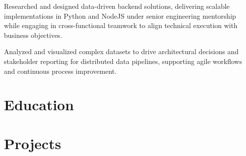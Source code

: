 \documentclass[10pt,a4paper]{resume}
\begin{document}
\bulletsend
\vspace{1.5pt}
\bullets
  \item Researched and designed data-driven backend solutions, delivering scalable implementations in Python and NodeJS under senior engineering mentorship while engaging in cross-functional teamwork to align technical execution with business objectives.
  \item Analyzed and visualized complex datasets to drive architectural decisions and stakeholder reporting for distributed data pipelines, supporting agile workflows and continuous process improvement.
\bulletsend
\vspace{1.5pt}

\section{Education}

\vspace{2pt}

\section{Projects}
\end{document}
